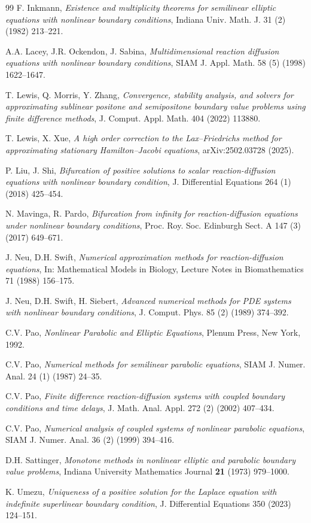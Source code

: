 \documentclass[12pt, reqno]{amsart}
\numberwithin{equation}{section}
\begin{document}
\begin{thebibliography}{99}
F. Inkmann,
\emph{Existence and multiplicity theorems for semilinear elliptic equations with nonlinear boundary conditions},
Indiana Univ. Math. J. 31 (2) (1982) 213--221.

A.A. Lacey, J.R. Ockendon, J. Sabina,
\emph{Multidimensional reaction diffusion equations with nonlinear boundary conditions},
SIAM J. Appl. Math. 58 (5) (1998) 1622--1647.

T. Lewis, Q. Morris, Y. Zhang,
\emph{Convergence, stability analysis, and solvers for approximating sublinear positone and semipositone boundary value problems using finite difference methods},
J. Comput. Appl. Math. 404 (2022) 113880.

T. Lewis, X. Xue,
\emph{A high order correction to the Lax--Friedrichs method for approximating stationary Hamilton--Jacobi equations},
arXiv:2502.03728 (2025).

P. Liu, J. Shi,
\emph{Bifurcation of positive solutions to scalar reaction-diffusion equations with nonlinear boundary condition},
J. Differential Equations 264 (1) (2018) 425--454.

N. Mavinga, R. Pardo,
\emph{Bifurcation from infinity for reaction-diffusion equations under nonlinear boundary conditions},
Proc. Roy. Soc. Edinburgh Sect. A 147 (3) (2017) 649--671.

J. Neu, D.H. Swift,
\emph{Numerical approximation methods for reaction-diffusion equations},
In: Mathematical Models in Biology, Lecture Notes in Biomathematics 71 (1988) 156--175.

J. Neu, D.H. Swift, H. Siebert,
\emph{Advanced numerical methods for PDE systems with nonlinear boundary conditions},
J. Comput. Phys. 85 (2) (1989) 374--392.

C.V. Pao,
\emph{Nonlinear Parabolic and Elliptic Equations},
Plenum Press, New York, 1992.

C.V. Pao,
\emph{Numerical methods for semilinear parabolic equations},
SIAM J. Numer. Anal. 24 (1) (1987) 24--35.

C.V. Pao,
\emph{Finite difference reaction-diffusion systems with coupled boundary conditions and time delays},
J. Math. Anal. Appl. 272 (2) (2002) 407--434.

C.V. Pao,
\emph{Numerical analysis of coupled systems of nonlinear parabolic equations},
SIAM J. Numer. Anal. 36 (2) (1999) 394--416.

D.H. Sattinger,
\emph{Monotone methods in nonlinear elliptic and parabolic boundary value problems},
Indiana University Mathematics Journal \textbf{21} (1973) 979--1000.

K. Umezu,
\emph{Uniqueness of a positive solution for the Laplace equation with indefinite superlinear boundary condition},
J. Differential Equations 350 (2023) 124--151.

\end{thebibliography}
\end{document}
